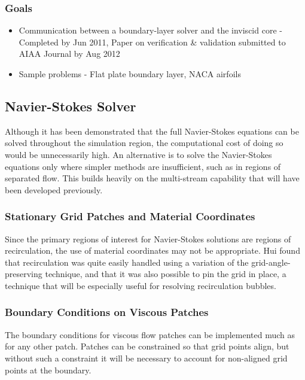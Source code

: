 \documentclass[12pt,letterpaper]{article}
\begin{document}
\subsubsection{Goals}
\begin{itemize}
\item Communication between a boundary-layer solver and the inviscid
  core - Completed by Jun 2011, Paper on verification \& validation
  submitted to AIAA Journal by Aug 2012
\item Sample problems - Flat plate boundary layer, NACA airfoils
\end{itemize}
\subsection{Navier-Stokes Solver}
Although it has been demonstrated that the full Navier-Stokes
equations can be solved throughout the simulation region, the
computational cost of doing so would be unnecessarily high.
An alternative is to solve the
Navier-Stokes equations only where simpler methods are insufficient,
such as in regions of separated flow. 
This builds heavily on the multi-stream capability that will have been
developed previously.
\subsubsection{Stationary Grid Patches and Material Coordinates}
Since the primary regions of interest for Navier-Stokes solutions are
regions of recirculation, the use of material coordinates may not be
appropriate. Hui found that recirculation was quite
easily handled using a variation of the grid-angle-preserving
technique, and that it was also possible to pin the grid in place, a
technique that will be especially useful for resolving recirculation
bubbles.\cite{huiviscous07}  
\subsubsection{Boundary Conditions on Viscous Patches}
The boundary conditions for viscous flow patches can be implemented
much as for any other patch. Patches can be constrained so that grid
points align, but without such a constraint it will be necessary to account for
non-aligned grid points at the boundary. 
\end{document}
